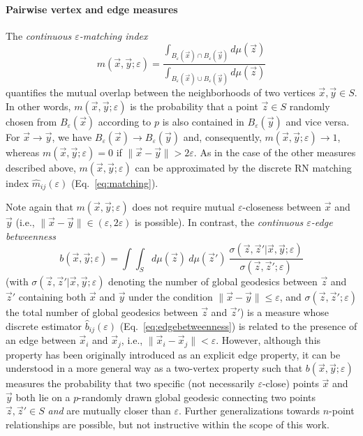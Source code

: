 		\paragraph{Pairwise vertex and edge measures}
		The \emph{continuous $\varepsilon$-matching index}
\begin{equation}
m(\vec{x},\vec{y};\varepsilon)=\frac{\int_{B_{\varepsilon}(\vec{x})\cap B_{\varepsilon}(\vec{y})}d\mu(\vec{z})}{\int_{B_{\varepsilon}(\vec{x})\cup B_{\varepsilon}(\vec{y})}d\mu(\vec{z})}
\end{equation}
\noindent
quantifies the mutual overlap between the neighborhoods of two vertices $\vec{x},\vec{y}\in S$. In other words, $m(\vec{x},\vec{y};\varepsilon)$ is the probability that a point $\vec{z}\in S$ randomly chosen from $B_{\varepsilon}(\vec{x})$ according to $p$ is also contained in $B_{\varepsilon}(\vec{y})$ and vice versa. For $\vec{x}\to \vec{y}$, we have $B_{\varepsilon}(\vec{x})\to B_{\varepsilon}(\vec{y})$ and, consequently, $m(\vec{x},\vec{y};\varepsilon)\to 1$, whereas $m(\vec{x},\vec{y};\varepsilon)=0$ if $\|\vec{x}-\vec{y}\|>2\varepsilon$. As in the case of the other measures described above, $m(\vec{x},\vec{y};\varepsilon)$ can be approximated by the discrete RN matching index $\hat{m}_{ij}(\varepsilon)$ (Eq.~\ref{eq:matching}).

		Note again that $m(\vec{x},\vec{y};\varepsilon)$ does not require mutual $\varepsilon$-closeness between $\vec{x}$ and $\vec{y}$ (i.e., $\|\vec{x}-\vec{y}\|\in(\varepsilon,2\varepsilon)$ is possible). In contrast, the \emph{continuous $\varepsilon$-edge betweenness}
\begin{equation}
b(\vec{x},\vec{y};\varepsilon)=\int\int_S d\mu(\vec{z})\ d\mu(\vec{z}')\ \frac{\sigma(\vec{z},\vec{z}'|\vec{x},\vec{y};\varepsilon)}{\sigma(\vec{z},\vec{z}';\varepsilon)}
\end{equation}
\noindent
(with $\sigma(\vec{z},\vec{z}'|\vec{x},\vec{y};\varepsilon)$ denoting the number of global geodesics between $\vec{z}$ and $\vec{z}'$ containing both $\vec{x}$ and $\vec{y}$ under the condition $\|\vec{x}-\vec{y}\|\leq\varepsilon$, and $\sigma(\vec{z},\vec{z}';\varepsilon)$ the total number of global geodesics between $\vec{z}$ and $\vec{z}'$) is a measure whose discrete estimator $\hat{b}_{ij}(\varepsilon)$ (Eq.~\ref{eq:edgebetweenness}) is related to the presence of an edge between $\vec{x}_i$ and $\vec{x}_j$, i.e., $\|\vec{x}_i-\vec{x}_j\|< \varepsilon$. However, although this property has been originally introduced as an explicit edge property, it can be understood in a more general way as a two-vertex property such that $b(\vec{x},\vec{y};\varepsilon)$ measures the probability that two specific (not necessarily $\varepsilon$-close) points $\vec{x}$ and $\vec{y}$ both lie on a $p$-randomly drawn global geodesic connecting two points $\vec{z},\vec{z}'\in S$ \emph{and} are mutually closer than $\varepsilon$. Further generalizations towards $n$-point relationships are possible, but not instructive within the scope of this work.


